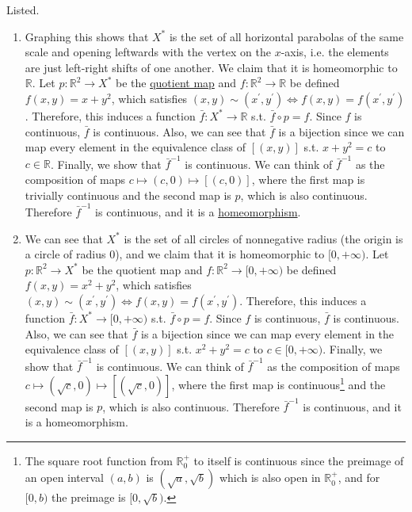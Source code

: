   \begin{solution}
    Listed. 
    \begin{enumerate}
      \item Graphing this shows that $X^\ast$ is the set of all horizontal parabolas of the same scale and opening leftwards with the vertex on the $x$-axis, i.e. the elements are just left-right shifts of one another. We claim that it is homeomorphic to $\mathbb{R}$. Let $p: \mathbb{R}^2 \rightarrow X^\ast$ be the \hyperref[def:quotient-map]{quotient map} and $f: \mathbb{R}^2 \rightarrow \mathbb{R}$ be defined $f(x, y) = x + y^2$, which satisfies $(x,y) \sim (x^\prime, y^\prime) \iff f(x, y) = f(x^\prime, y^\prime)$. Therefore, this induces a function $\bar{f}: X^\ast  \rightarrow \mathbb{R}$ s.t. $\bar{f} \circ p = f$. Since $f$ is continuous, $\bar{f}$ is continuous. Also, we can see that $\bar{f}$ is a bijection since we can map every element in the equivalence class of $[(x, y)]$ s.t. $x + y^2 = c$ to $c \in \mathbb{R}$. Finally, we show that $\bar{f}^{-1}$ is continuous. We can think of $\bar{f}^{-1}$ as the composition of maps $c \mapsto (c, 0) \mapsto [(c, 0)]$, where the first map is trivially continuous and the second map is $p$, which is also continuous. Therefore $\bar{f}^{-1}$ is continuous, and it is a \hyperref[def:homeomorphism]{homeomorphism}. 
        
      \item We can see that $X^\ast$ is the set of all circles of nonnegative radius (the origin is a circle of radius $0$), and we claim that it is homeomorphic to $[0, +\infty)$. Let $p: \mathbb{R}^2 \rightarrow X^\ast$ be the quotient map and $f: \mathbb{R}^2 \rightarrow [0, +\infty)$ be defined $f(x, y) = x^2 + y^2$, which satisfies $(x,y) \sim (x^\prime, y^\prime) \iff f(x, y) = f(x^\prime, y^\prime)$. Therefore, this induces a function $\bar{f}: X^\ast  \rightarrow [0, +\infty)$ s.t. $\bar{f} \circ p = f$. Since $f$ is continuous, $\bar{f}$ is continuous. Also, we can see that $\bar{f}$ is a bijection since we can map every element in the equivalence class of $[(x, y)]$ s.t. $x^2 + y^2 = c$ to $c \in [0, +\infty)$. Finally, we show that $\bar{f}^{-1}$ is continuous. We can think of $\bar{f}^{-1}$ as the composition of maps $c \mapsto (\sqrt{c}, 0) \mapsto [(\sqrt{c}, 0)]$, where the first map is continuous\footnote{The square root function from $\mathbb{R}_0^+$ to itself is continuous since the preimage of an open interval $(a, b)$ is $(\sqrt{a}, \sqrt{b})$ which is also open in $\mathbb{R}_0^+$, and for $[0, b)$ the preimage is $[0, \sqrt{b})$.} and the second map is $p$, which is also continuous. Therefore $\bar{f}^{-1}$ is continuous, and it is a homeomorphism. 
    \end{enumerate}
  \end{solution}


